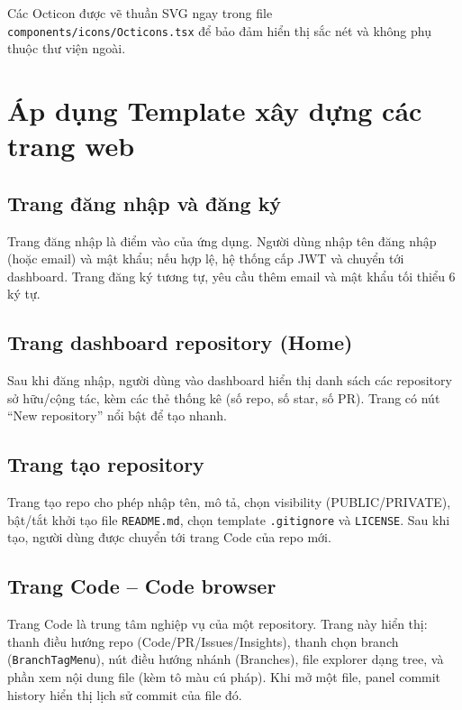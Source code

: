 Các Octicon được vẽ thuần SVG ngay trong file \texttt{components/icons/Octicons.tsx} để bảo đảm hiển thị sắc nét và không phụ thuộc thư viện ngoài.

\section{Áp dụng Template xây dựng các trang web}

\subsection{Trang đăng nhập và đăng ký}
Trang đăng nhập là điểm vào của ứng dụng. Người dùng nhập tên đăng nhập (hoặc email) và mật khẩu; nếu hợp lệ, hệ thống cấp JWT và chuyển tới dashboard. Trang đăng ký tương tự, yêu cầu thêm email và mật khẩu tối thiểu 6 ký tự.


\subsection{Trang dashboard repository (Home)}
Sau khi đăng nhập, người dùng vào dashboard hiển thị danh sách các repository sở hữu/cộng tác, kèm các thẻ thống kê (số repo, số star, số PR). Trang có nút ``New repository'' nổi bật để tạo nhanh.


\subsection{Trang tạo repository}
Trang tạo repo cho phép nhập tên, mô tả, chọn visibility (PUBLIC/PRIVATE), bật/tắt khởi tạo file \texttt{README.md}, chọn template \texttt{.gitignore} và \texttt{LICENSE}. Sau khi tạo, người dùng được chuyển tới trang Code của repo mới.


\subsection{Trang Code -- Code browser}
Trang Code là trung tâm nghiệp vụ của một repository. Trang này hiển thị: thanh điều hướng repo (Code/PR/Issues/Insights), thanh chọn branch (\texttt{BranchTagMenu}), nút điều hướng nhánh (Branches), file explorer dạng tree, và phần xem nội dung file (kèm tô màu cú pháp). Khi mở một file, panel commit history hiển thị lịch sử commit của file đó.

